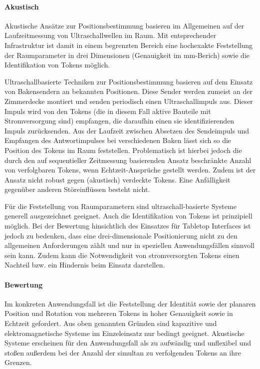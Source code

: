 
\paragraph{Akustisch} %
\label{par:akustisch}

Akustische Ansätze zur Positionsbestimmung basieren im Allgemeinen auf der Laufzeitmessung von Ultraschallwellen im Raum. Mit entsprechender Infrastruktur ist damit in einem begrenzten Bereich eine hochexakte Feststellung der Raumparameter in drei Dimensionen (Genauigkeit im mm-Berich) sowie die Identifikation von Tokens möglich.

Ultraschallbasierte Techniken zur Positionsbestimmung basieren auf dem Einsatz von Bakensendern an bekannten Positionen. Diese Sender werden zumeist an der Zimmerdecke montiert und senden periodisch einen Ultraschallimpuls aus. Dieser Impuls wird von den Tokens (die in diesem Fall aktive Bauteile mit Stromversorgung sind) empfangen, die daraufhin einen sie identifizierenden Impuls zurücksenden. Aus der Laufzeit zwischen Absetzen des Sendeimpuls und Empfangen des Antwortimpulses bei verschiedenen Baken lässt sich so die Position des Tokens im Raum feststellen. Problematisch ist hierbei jedoch die durch den auf sequentieller Zeitmessung basierenden Ansatz beschränkte Anzahl von verfolgbaren Tokens, wenn Echtzeit-Ansprüche gestellt werden. Zudem ist der Ansatz nicht robust gegen (akustisch) verdeckte Tokens. Eine Anfälligkeit gegenüber anderen Störeinflüssen besteht nicht. 

Für die Feststellung von Raumparametern sind ultraschall-basierte Systeme generell ausgezeichnet geeignet. Auch die Identifikation von Tokens ist prinzipiell möglich. Bei der Bewertung hinsichtlich des Einsatzes für Tabletop Interfaces ist jedoch zu bedenken, dass eine drei-dimensionale Positionierung nicht zu den allgemeinen Anforderungen zählt und nur in speziellen Anwendungsfällen sinnvoll sein kann. Zudem kann die Notwendigkeit von stromversorgten Tokens einen Nachteil bzw. ein Hindernis beim Einsatz darstellen.


\paragraph{Bewertung} %
\label{par:bewertung}

Im konkreten Anwendungsfall ist die Feststellung der Identität sowie der planaren Position und Rotation von mehreren Tokens in hoher Genauigkeit sowie in Echtzeit gefordert. Aus oben genannten Gründen sind kapazitive und elektromagnetische Systeme im Einzeleinsatz nur bedingt geeignet. Akustische Systeme erscheinen für den Anwendungsfall als zu aufwändig und unflexibel und stoßen außerdem bei der Anzahl der simultan zu verfolgenden Tokens an ihre Grenzen.

